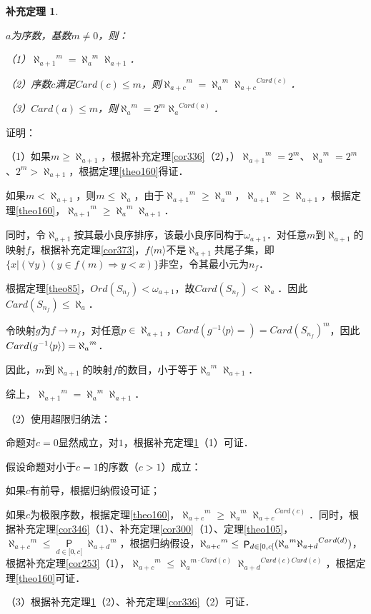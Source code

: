 \documentclass[12pt, a4paper, oneside]{book}
\newtheorem{cor}{补充定理}
\begin{document}
			\begin{cor}\label{cor382}
				\hfill\par
				$a$为序数，基数$m\neq 0$，则：
				\par
				（1）${\aleph_{a+1}}^m={\aleph_a}^m\aleph_{a+1}$．
				\par
				（2）序数$c$满足$Card(c)\leq m$，则${\aleph_{a+c}}^m={\aleph_a}^m{\aleph_{a+c}}^{Card(c)}$．
				\par
				（3）$Card(a)\leq m$，则${\aleph_a}^m=2^m{\aleph_a}^{Card(a)}$．
			\end{cor}
			证明：
			\par
			（1）如果$m\geq \aleph_{a+1}$，根据补充定理\ref{cor336}（2），）${\aleph_{a+1}}^m=2^m$、${\aleph_a}^m=2^m$、$2^m>\aleph_{a+1}$，根据定理\ref{theo160}得证．
			\par
			如果$m<\aleph_{a+1}$，则$m\leq \aleph_a$，由于${\aleph_{a+1}}^m\geq {\aleph_a}^m$，${\aleph_{a+1}}^m\geq \aleph_{a+1}$，根据定理\ref{theo160}，${\aleph_{a+1}}^m\geq {\aleph_a}^m\aleph_{a+1}$．
			\par
			同时，令$\aleph_{a+1}$按其最小良序排序，该最小良序同构于$\omega_{a+1}$．对任意$m$到$\aleph_{a+1}$的映射$f$，根据补充定理\ref{cor373}，$f\langle m\rangle$不是$\aleph_{a+1}$共尾子集，即$\{x|(\forall y)(y\in f(m)\Rightarrow y<x)\}$非空，令其最小元为$n_f$．
			\par
			根据定理\ref{theo85}，$Ord(S_{n_f})< \omega_{a+1}$，故$Card(S_{n_f})<\aleph_a$．因此$Card(S_{n_f})\leq \aleph_a$．
			\par
			令映射$g$为$f\to n_f$，对任意$p\in \aleph_{a+1}$，$Card(g^{-1}\langle p \rangle=			)=Card(S_{n_f})^m$，因此\\$Card(g^{-1}\langle p \rangle)\\={\aleph_a}^m$．
			\par
			因此，$m$到$\aleph_{a+1}$的映射$f$的数目，小于等于${\aleph_a}^m\aleph_{a+1}$．
			\par
			综上，${\aleph_{a+1}}^m={\aleph_a}^m\aleph_{a+1}$．
			\par
			（2）使用超限归纳法：
			\par
			命题对$c=0$显然成立，对$1$，根据补充定理\ref{cor382}（1）可证．
			\par
			假设命题对小于$c=1$的序数（$c>1$）成立：
			\par
			如果$c$有前导，根据归纳假设可证；
			\par
			如果$c$为极限序数，根据定理\ref{theo160}，${\aleph_{a+c}}^m\geq {\aleph_a}^m{\aleph_{a+c}}^{Card(c)}$．同时，根据补充定理\ref{cor346}（1）、补充定理\ref{cor300}（1）、定理\ref{theo105}，${\aleph_{a+c}}^m\leq \mathop{\mathsf{P}}\limits_{d\in [0, c[}{\aleph_{a+d}}^m$，根据归纳假设，${\aleph_{a+c}}^m\leq\\\mathop{\mathsf{P}}_{d\in [0, c[}({\aleph_a}^m{\aleph_{a+d}}^{Card(d)})$，根据补充定理\ref{cor253}（1），${\aleph_{a+c}}^m\leq {\aleph_a}^{m\cdot Card(c)}{\aleph_{a+d}}^{Card(c) Card(c)}$，根据定理\ref{theo160}可证．
			\par
			（3）根据补充定理\ref{cor382}（2）、补充定理\ref{cor336}（2）可证．
			
\end{document}
